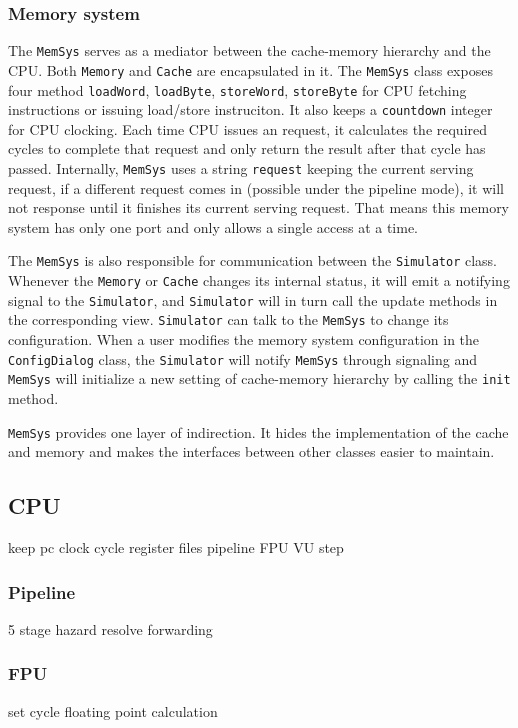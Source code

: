 \documentclass{sig-alternate}
\begin{document}
\subsubsection{Memory system}
The \texttt{MemSys} serves as a mediator between the cache-memory hierarchy and the CPU. Both \texttt{Memory} and \texttt{Cache} are encapsulated in it. The \texttt{MemSys} class exposes four method \texttt{loadWord}, \texttt{loadByte}, \texttt{storeWord}, \texttt{storeByte} for CPU fetching instructions or issuing load/store instruciton. It also keeps a \texttt{countdown} integer for CPU clocking. Each time CPU issues an request, it calculates the required cycles to complete that request and only return the result after that cycle has passed. Internally, \texttt{MemSys} uses a string \texttt{request} keeping the current serving request, if a different request comes in (possible under the pipeline mode), it will not response until it finishes its current serving request. That means this memory system has only one port and only allows a single access at a time. 

The \texttt{MemSys} is also responsible for communication between the \texttt{Simulator} class. Whenever the \texttt{Memory} or \texttt{Cache} changes its internal status, it will emit a notifying signal to the \texttt{Simulator}, and \texttt{Simulator} will in turn call the update methods in the corresponding view. \texttt{Simulator} can talk to the \texttt{MemSys} to change its configuration. When a user modifies the memory system configuration in the \texttt{ConfigDialog} class, the \texttt{Simulator} will notify \texttt{MemSys} through signaling and \texttt{MemSys} will initialize a new setting of cache-memory hierarchy by calling the \texttt{init} method.

\texttt{MemSys} provides one layer of indirection. It hides the implementation of the cache and memory and makes the interfaces between other classes easier to maintain. 

\subsection{CPU}
keep pc clock cycle register files pipeline FPU VU
step 
\subsubsection{Pipeline}
5 stage hazard resolve forwarding
\subsubsection{FPU}
set cycle floating point calculation 
\end{document}
